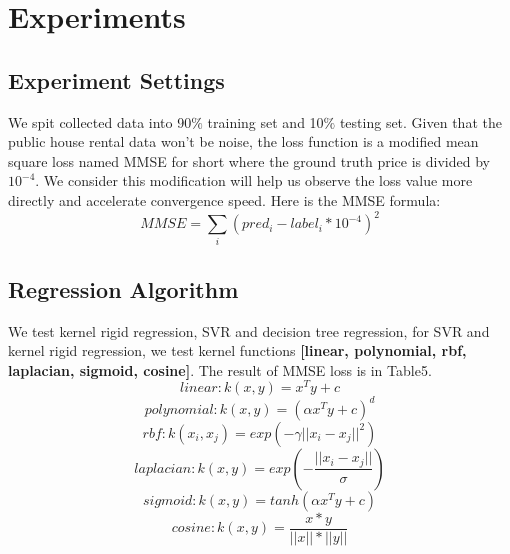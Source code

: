 \documentclass[final]{cvpr}
\begin{document}
\section{Experiments}
\subsection{Experiment Settings}
We spit collected data into 90$\%$ training set and 10$\%$ testing set. Given that the public house rental data won't be noise, the loss function is a modified mean square loss named MMSE for short where the ground truth price is divided by $10^{-4}$. We consider this modification will help us observe the loss value more directly and accelerate convergence speed. Here is the MMSE formula:
\begin{displaymath}
MMSE = \sum_i (pred_i - label_i*10^{-4})^{2}
\end{displaymath}

\subsection{Regression Algorithm}
We test kernel rigid regression, SVR and decision tree regression, for SVR and kernel rigid regression, we test kernel functions \textbf{[linear, polynomial, rbf, laplacian, sigmoid, cosine]}. The result of MMSE loss is in Table5.
\begin{displaymath}
linear: k(x,y) = x^Ty + c
\end{displaymath}
\begin{displaymath}
polynomial: k(x,y) = (\alpha x^Ty + c)^d 
\end{displaymath}
\begin{displaymath}
rbf: k(x_i,x_j) = exp(-\gamma ||x_i - x_j||^2)
\end{displaymath}
\begin{displaymath}
laplacian: k(x,y) = exp(-\frac{||x_i - x_j||}{\sigma})
\end{displaymath}
\begin{displaymath}
sigmoid: k(x,y) = tanh(\alpha x^Ty + c)
\end{displaymath}
\begin{displaymath}
cosine: k(x,y) = \frac{x*y}{||x||*||y||}
\end{displaymath}
\end{document}
